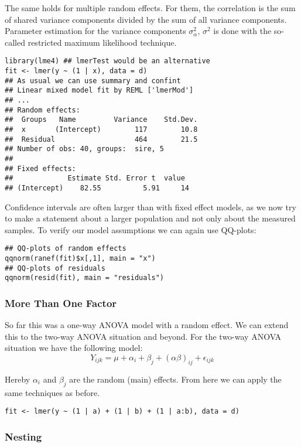 The same holds for multiple random effects. For them, the correlation is the sum of shared variance components divided by the sum of all variance components. Parameter estimation for the variance components $\sigma_\alpha^2,\, \sigma^2$ is done with the so-called restricted maximum likelihood technique.

\begin{lstlisting}
library(lme4) ## lmerTest would be an alternative
fit <- lmer(y ~ (1 | x), data = d)
## As usual we can use summary and confint
## Linear mixed model fit by REML ['lmerMod']
## ...
## Random effects:
##  Groups   Name         Variance    Std.Dev.
##  x       (Intercept)        117        10.8    
##  Residual                   464        21.5    
## Number of obs: 40, groups:  sire, 5
## 
## Fixed effects:
##             Estimate Std. Error t  value
## (Intercept)    82.55          5.91     14
\end{lstlisting}

Confidence intervals are often larger than with fixed effect models, as we now try to make a statement about a larger population and not only about the measured samples. To verify our model assumptions we can again use QQ-plots:
\begin{lstlisting}
## QQ-plots of random effects
qqnorm(ranef(fit)$x[,1], main = "x")
## QQ-plots of residuals
qqnorm(resid(fit), main = "residuals")
\end{lstlisting}

\subsubsection{More Than One Factor}

So far this was a one-way ANOVA model with a random effect. We can extend this to the two-way ANOVA situation and beyond. For the two-way ANOVA situation we have the following model:
$$Y_{ijk} = \mu + \alpha_i + \beta_j + (\alpha \beta)_{ij} + \epsilon_{ijk}$$

Hereby $\alpha_i$ and $\beta_j$ are the random (main) effects. From here we can apply the same techniques as before.
\begin{lstlisting}
fit <- lmer(y ~ (1 | a) + (1 | b) + (1 | a:b), data = d)
\end{lstlisting}

\subsubsection{Nesting}

